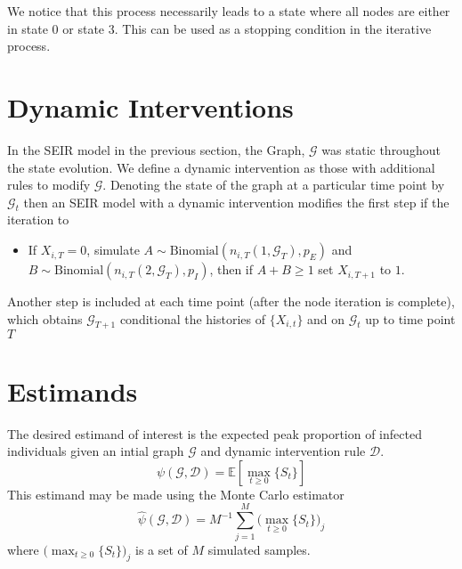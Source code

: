 \documentclass{article}
\newcommand{\e}[1]{{\mathbb E}\left[ #1 \right]}
\begin{document}
    We notice that this process necessarily leads to a state where all nodes are either in state 0 or state 3. This can be used
    as a stopping condition in the iterative process.

    \section{Dynamic Interventions}

    In the SEIR model in the previous section, the Graph, $\mathcal{G}$ was static throughout the state evolution.
    We define a dynamic intervention as those with additional rules to modify $\mathcal{G}$. Denoting the state of the
    graph at a particular time point by $\mathcal{G}_t$ then an SEIR model with a dynamic intervention modifies the first
    step if the iteration to
    \begin{itemize}
        \item If $X_{i,T} = 0$, simulate $A \sim \text{Binomial}(n_{i,T}(1,\mathcal{G}_T),p_E)$ and
              $B \sim \text{Binomial}(n_{i,T}(2,\mathcal{G}_T),p_I)$, then if $A+B \geq 1$ set $X_{i,T+1}$ to $1$.
    \end{itemize}
    Another step is included at each time point (after the node iteration is complete), which obtains $\mathcal{G}_{T+1}$
    conditional the histories of $\{X_{i,t}\}$ and on $\mathcal{G}_t$ up to time point $T$

    \section{Estimands}

    The desired estimand of interest is the expected peak proportion of infected individuals given an intial graph $\mathcal{G}$
    and dynamic intervention rule $\mathcal{D}$.
    \begin{equation}
        \psi(\mathcal{G},\mathcal{D}) = \e{\max_{t \geq 0 } \{S_t\} }
    \end{equation}
    This estimand may be made using the Monte Carlo estimator
    \begin{equation}
        \hat{\psi}(\mathcal{G},\mathcal{D}) = M^{-1} \sum_{j=1}^{M} \big(\max_{t \geq 0 } \{S_t\}\big)_j
    \end{equation}
    where $\big(\max_{t \geq 0 } \{S_t\}\big)_j$ is a set of $M$ simulated samples.
\end{document}
